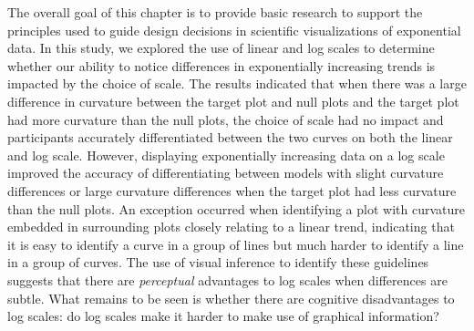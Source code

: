\documentclass[12pt]{article}
\begin{document}
The overall goal of this chapter is to provide basic research to support
the principles used to guide design decisions in scientific
visualizations of exponential data. In this study, we explored the use
of linear and log scales to determine whether our ability to notice
differences in exponentially increasing trends is impacted by the choice
of scale. The results indicated that when there was a large difference
in curvature between the target plot and null plots and the target plot
had more curvature than the null plots, the choice of scale had no
impact and participants accurately differentiated between the two curves
on both the linear and log scale. However, displaying exponentially
increasing data on a log scale improved the accuracy of differentiating
between models with slight curvature differences or large curvature
differences when the target plot had less curvature than the null plots.
An exception occurred when identifying a plot with curvature embedded in
surrounding plots closely relating to a linear trend, indicating that it
is easy to identify a curve in a group of lines but much harder to
identify a line in a group of curves. The use of visual inference to
identify these guidelines suggests that there are \emph{perceptual}
advantages to log scales when differences are subtle. What remains to be
seen is whether there are cognitive disadvantages to log scales: do log
scales make it harder to make use of graphical information?



\end{document}

